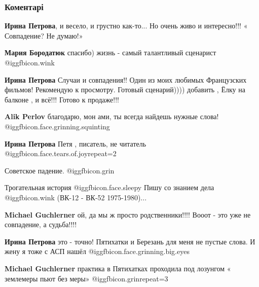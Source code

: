  
 
 
 
 
\subsubsection{Коментарі}
\label{sec:29_01_2021.fb.fb_group.story_kiev_ua.1.devushka_ulybka.cmt}

\begin{itemize} %
\textbf{Ирина Петрова}, и весело, и грустно как-то... Но очень живо и интересно!!! « Совпадение? Не думаю!»

\begin{itemize} %
\textbf{Мария Бородатюк} спасибо) жизнь - самый талантливый сценарист @igg{fbicon.wink} 

\textbf{Ирина Петрова} Случаи и совпадения!! Один из моих любимых Французских фильмов! Рекомендую к просмотру. Готовый сценарий)))) добавить , Ёлку на балконе , и всё!!! Готово к продаже!!!

\textbf{Alik Perlov} благодарю, мон ами, ты всегда найдешь нужные слова! @igg{fbicon.face.grinning.squinting} 

\textbf{Ирина Петрова} Петя , писатель, не читатель @igg{fbicon.face.tears.of.joy}{repeat=2} 
\end{itemize} %

Советское падение.  @igg{fbicon.grin} 


Трогательная история @igg{fbicon.face.sleepy} 
Пишу со знанием дела  @igg{fbicon.wink}  (ВК-12 - ВК-52 1975-1980)...

\begin{itemize} %
\textbf{Michael Guchlerner} ой, да мы ж просто родственники!!!! Вооот - это уже не совпадение, а судьба!!!!

\textbf{Ирина Петрова} это - точно! Пятихатки и Березань для меня не пустые слова.
И жену я тоже с АСП нашёл  @igg{fbicon.face.grinning.big.eyes} 

\textbf{Michael Guchlerner} практика в Пятихатках проходила под лозунгом « землемеры пьют без меры» @igg{fbicon.grin}{repeat=3} 


\end{itemize}
\end{itemize}
